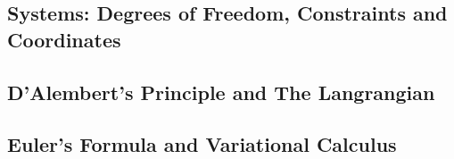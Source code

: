 \subsection{Systems: Degrees of Freedom, Constraints and Coordinates}
\subsection{D'Alembert's Principle and The Langrangian}
\subsection{Euler's Formula and Variational Calculus}